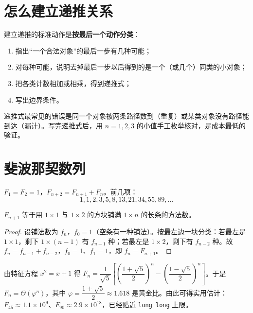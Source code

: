 \section{怎么建立递推关系}
建立递推的标准动作是\textbf{按最后一个动作分类}：
\begin{enumerate}
\item 指出“一个合法对象”的最后一步有几种可能；
\item 对每种可能，说明去掉最后一步以后得到的是一个（或几个）同类的小对象；
\item 把各类计数相加或相乘，得到递推式；
\item 写出边界条件。
\end{enumerate}

\begin{pitfall}[重复计数与漏计]
递推式最常见的错误是同一个对象被两条路径数到（重复）或某类对象没有路径能到达（漏计）。写完递推式后，用 $n=1,2,3$ 的小值手工枚举核对，是成本最低的验证。
\end{pitfall}

\section{斐波那契数列}
\begin{definition}[斐波那契数列]
$F_1=F_2=1$，$F_{n+2}=F_{n+1}+F_n$。前几项：
\[
1,1,2,3,5,8,13,21,34,55,89,\ldots
\]
\end{definition}
\begin{theorem}[斐波那契的组合解释]
$F_{n+1}$ 等于用 $1\times1$ 与 $1\times2$ 的方块铺满 $1\times n$ 的长条的方法数。
\end{theorem}
\begin{proof}
设铺法数为 $f_n$，$f_0=1$（空条有一种铺法）。按最左边一块分类：若最左是 $1\times1$，剩下 $1\times(n-1)$ 有 $f_{n-1}$ 种；若最左是 $1\times2$，剩下有 $f_{n-2}$ 种。故 $f_n=f_{n-1}+f_{n-2}$，$f_0=1$、$f_1=1$，即 $f_n=F_{n+1}$。
\end{proof}

\begin{tip}[斐波那契的增长速度]
由特征方程 $x^2=x+1$ 得 $F_n=\dfrac{1}{\sqrt5}\left[\left(\dfrac{1+\sqrt5}{2}\right)^n-\left(\dfrac{1-\sqrt5}{2}\right)^n\right]$。于是 $F_n=\Theta(\varphi^n)$，其中 $\varphi=\dfrac{1+\sqrt5}{2}\approx1.618$ 是黄金比。由此可得实用估计：$F_{45}\approx1.1\times10^9$、$F_{90}\approx2.9\times10^{18}$，已经贴近 \texttt{long long} 上限。
\end{tip}

